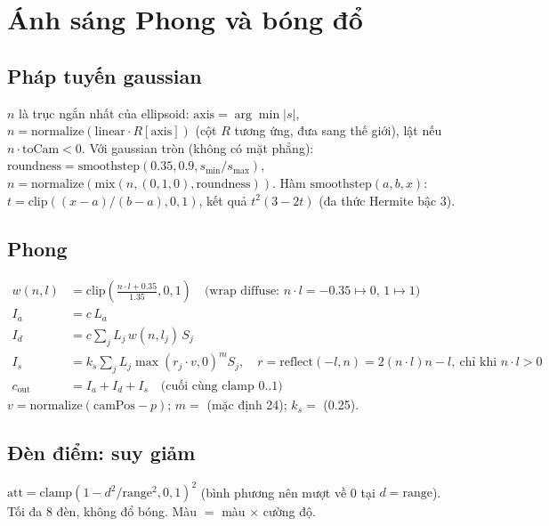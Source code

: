 \section{Ánh sáng Phong và bóng đổ}\label{s:phong}

\subsection{Pháp tuyến gaussian}
$n$ là trục ngắn nhất của ellipsoid: $\mathrm{axis}=\arg\min|s|$, $n=\mathrm{normalize}(\mathrm{linear}\cdot R[\mathrm{axis}])$ (cột $R$ tương ứng, đưa sang thế giới), lật nếu $n\cdot\mathrm{toCam}<0$. Với gaussian tròn (không có mặt phẳng): $\mathrm{roundness}=\mathrm{smoothstep}(0.35,0.9,s_{\min}/s_{\max})$, $n=\mathrm{normalize}(\mathrm{mix}(n,(0,1,0),\mathrm{roundness}))$. Hàm $\mathrm{smoothstep}(a,b,x)$: $t=\mathrm{clip}((x-a)/(b-a),0,1)$, kết quả $t^2(3-2t)$ (đa thức Hermite bậc 3).

\subsection{Phong}
\begin{align*}
w(n,l)&=\mathrm{clip}\!\left(\frac{n\cdot l+0.35}{1.35},0,1\right)\quad\text{(wrap diffuse: $n\cdot l=-0.35\mapsto0$, $1\mapsto1$)}\\
I_a&=c\,L_a\\
I_d&=c\sum_j L_j\,w(n,l_j)\,S_j\\
I_s&=k_s\sum_j L_j\max(r_j\cdot v,0)^m S_j,\quad r=\mathrm{reflect}(-l,n)=2(n\cdot l)n-l,\ \text{chỉ khi }n\cdot l>0\\
c_{\mathrm{out}}&=I_a+I_d+I_s\quad\text{(cuối cùng clamp 0..1)}
\end{align*}
$v=\mathrm{normalize}(\mathrm{camPos}-p)$; $m=$  (mặc định 24); $k_s=$  (0.25).

\subsection{Đèn điểm: suy giảm}
$\mathrm{att}=\mathrm{clamp}(1-d^2/\mathrm{range}^2,0,1)^2$ (bình phương nên mượt về 0 tại $d=\mathrm{range}$). Tối đa 8 đèn, không đổ bóng. Màu $=$ màu $\times$ cường độ.


